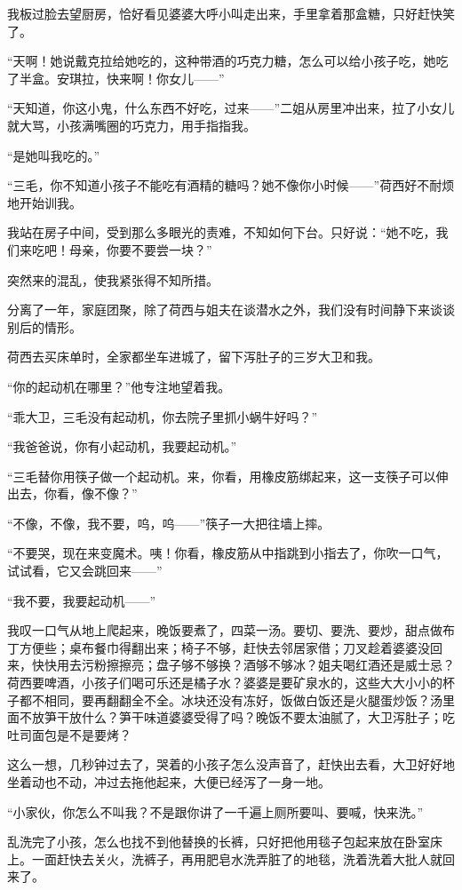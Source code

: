 \par 我板过脸去望厨房，恰好看见婆婆大呼小叫走出来，手里拿着那盒糖，只好赶快笑了。
\par “天啊！她说戴克拉给她吃的，这种带酒的巧克力糖，怎么可以给小孩子吃，她吃了半盒。安琪拉，快来啊！你女儿——”
\par “天知道，你这小鬼，什么东西不好吃，过来——”二姐从房里冲出来，拉了小女儿就大骂，小孩满嘴圈的巧克力，用手指指我。
\par “是她叫我吃的。”
\par “三毛，你不知道小孩子不能吃有酒精的糖吗？她不像你小时候——”荷西好不耐烦地开始训我。
\par 我站在房子中间，受到那么多眼光的责难，不知如何下台。只好说：“她不吃，我们来吃吧！母亲，你要不要尝一块？”
\par 突然来的混乱，使我紧张得不知所措。
\par 分离了一年，家庭团聚，除了荷西与姐夫在谈潜水之外，我们没有时间静下来谈谈别后的情形。
\par 荷西去买床单时，全家都坐车进城了，留下泻肚子的三岁大卫和我。
\par “你的起动机在哪里？”他专注地望着我。
\par “乖大卫，三毛没有起动机，你去院子里抓小蜗牛好吗？”
\par “我爸爸说，你有小起动机，我要起动机。”
\par “三毛替你用筷子做一个起动机。来，你看，用橡皮筋绑起来，这一支筷子可以伸出去，你看，像不像？”
\par “不像，不像，我不要，呜，呜——”筷子一大把往墙上摔。
\par “不要哭，现在来变魔术。咦！你看，橡皮筋从中指跳到小指去了，你吹一口气，试试看，它又会跳回来——”
\par “我不要，我要起动机——”
\par 我叹一口气从地上爬起来，晚饭要煮了，四菜一汤。要切、要洗、要炒，甜点做布丁方便些；桌布餐巾得翻出来；椅子不够，赶快去邻居家借；刀叉趁着婆婆没回来，快快用去污粉擦擦亮；盘子够不够换？酒够不够冰？姐夫喝红酒还是威士忌？荷西要啤酒，小孩子们喝可乐还是橘子水？婆婆是要矿泉水的，这些大大小小的杯子都不相同，要再翻翻全不全。冰块还没有冻好，饭做白饭还是火腿蛋炒饭？汤里面不放笋干放什么？笋干味道婆婆受得了吗？晚饭不要太油腻了，大卫泻肚子；吃吐司面包是不是要烤？
\par 这么一想，几秒钟过去了，哭着的小孩子怎么没声音了，赶快出去看，大卫好好地坐着动也不动，冲过去拖他起来，大便已经泻了一身一地。
\par “小家伙，你怎么不叫我？不是跟你讲了一千遍上厕所要叫、要喊，快来洗。”
\par 乱洗完了小孩，怎么也找不到他替换的长裤，只好把他用毯子包起来放在卧室床上。一面赶快去关火，洗裤子，再用肥皂水洗弄脏了的地毯，洗着洗着大批人就回来了。
